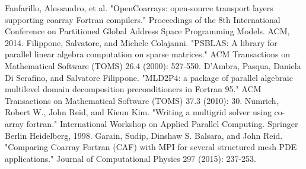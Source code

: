 \documentclass{IOS-Book-Article}
\begin{document}
\begin{thebibliography}{99}

Fanfarillo, Alessandro, et al. "OpenCoarrays: open-source transport layers supporting coarray Fortran compilers." Proceedings of the 8th International Conference on Partitioned Global Address Space Programming Models. ACM, 2014.
Filippone, Salvatore, and Michele Colajanni. "PSBLAS: A library for parallel linear algebra computation on sparse matrices." ACM Transactions on Mathematical Software (TOMS) 26.4 (2000): 527-550.
D’Ambra, Pasqua, Daniela Di Serafino, and Salvatore Filippone. "MLD2P4: a package of parallel algebraic multilevel domain decomposition preconditioners in Fortran 95." ACM Transactions on Mathematical Software (TOMS) 37.3 (2010): 30.
Numrich, Robert W., John Reid, and Kieun Kim. "Writing a multigrid solver using co-array fortran." International Workshop on Applied Parallel Computing. Springer Berlin Heidelberg, 1998.
Garain, Sudip, Dinshaw S. Balsara, and John Reid. "Comparing Coarray Fortran (CAF) with MPI for several structured mesh PDE applications." Journal of Computational Physics 297 (2015): 237-253.
\end{thebibliography}
\end{document}
